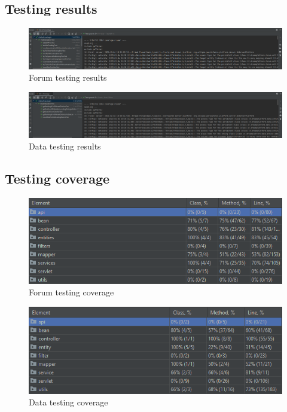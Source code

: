 \subsection{Testing results}

\begin{figure}[h!]
    \centering
    \includegraphics[scale=0.25]{images/testing/testing_forum.png}
    \caption{Forum testing results}
    \label{fig:forum_testing}
\end{figure}
\FloatBarrier

\begin{figure}[h!]
    \centering
    \includegraphics[scale=0.25]{images/testing/testing_data.png}
    \caption{Data testing results}
    \label{fig:data_testing}
\end{figure}
\FloatBarrier

\subsection{Testing coverage}

\begin{figure}[h!]
    \centering
    \includegraphics[scale=0.50]{images/testing/coverage_forum.png}
    \caption{Forum testing coverage}
    \label{fig:forum_coverage}
\end{figure}
\FloatBarrier

\begin{figure}[h!]
    \centering
    \includegraphics[scale=0.50]{images/testing/coverage_data.png}
    \caption{Data testing coverage}
    \label{fig:data_coverage}
\end{figure}
\FloatBarrier